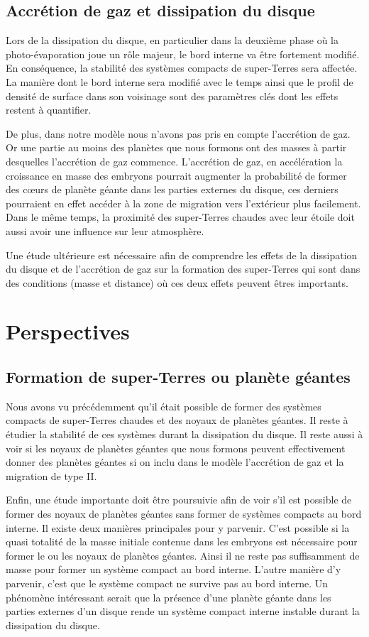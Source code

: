 \subsection{Accrétion de gaz et dissipation du disque}
Lors de la dissipation du disque, en particulier dans la deuxième phase où la photo-évaporation joue un rôle majeur, le bord interne va être fortement modifié. En conséquence, la stabilité des systèmes compacts de super-Terres sera affectée. La manière dont le bord interne sera modifié avec le temps ainsi que le profil de densité de surface dans son voisinage sont des paramètres clés dont les effets restent à quantifier. 

De plus, dans notre modèle nous n'avons pas pris en compte l'accrétion de gaz. Or une partie au moins des planètes que nous
formons ont des masses à partir desquelles l'accrétion de gaz commence. L'accrétion de gaz, en accélération la croissance en
masse des embryons pourrait augmenter la probabilité de former des cœurs de planète géante dans les parties externes du
disque, ces derniers pourraient en effet accéder à la zone de migration vers l'extérieur plus facilement. Dans le même temps, la
proximité des super-Terres chaudes avec leur étoile doit aussi avoir une influence sur leur atmosphère. 

Une étude ultérieure est nécessaire afin de comprendre les effets de la dissipation du disque et de l'accrétion de gaz sur la formation des super-Terres qui sont dans des conditions (masse et distance) où ces deux effets peuvent êtres importants.


\section{Perspectives}
\subsection{Formation de super-Terres ou planète géantes}
Nous avons vu précédemment qu'il était possible de former des systèmes compacts de super-Terres chaudes et des noyaux de planètes géantes. Il reste à étudier la stabilité de ces systèmes durant la dissipation du disque. Il reste aussi à voir si les noyaux de planètes géantes que nous formons peuvent effectivement donner des planètes géantes si on inclu dans le modèle l'accrétion de gaz et la migration de type II. 

Enfin, une étude importante doit être poursuivie afin de voir s'il est possible de former des noyaux de planètes géantes sans former de systèmes compacts au bord interne. Il existe deux manières principales pour y parvenir. C'est possible si la quasi totalité de la masse initiale contenue dans les embryons est nécessaire pour former le ou les noyaux de planètes géantes. Ainsi il ne reste pas suffisamment de masse pour former un système compact au bord interne. L'autre manière d'y parvenir, c'est que le système compact ne survive pas au bord interne. Un phénomène intéressant serait que la présence d'une planète géante dans les parties externes d'un disque rende un système compact interne instable durant la dissipation du disque. 

